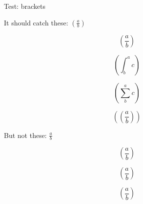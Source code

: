 \documentclass{article}
\begin{document}
Test: brackets

It should catch these: $(\frac{a}{b})$

\[
    (\frac{a}{b})
\]

\[
(\int^a_b c)
\]

\[(\sum^a_b c)\]

\[
    (\left(\frac{a}{b}\right))
\]

But not these: \(\frac{a}{b}\)

\[
    \left(\frac{a}{b}\right)
\]

\[
\left(\frac{a}{b}\right)
\]

\[\left(\frac{a}{b}\right)\]
\end{document}

